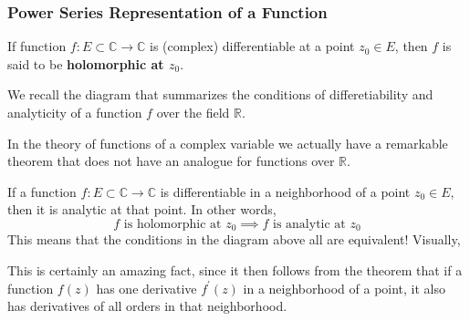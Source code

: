     \subsubsection{Power Series Representation of a Function}
    \begin{definition}
      \label{def:holomorphic-function}
      If function $f: E \subset \mathbb{C} \to \mathbb{C}$ is (complex) differentiable at a point $z_0 \in E$, then $f$ is said to be \textbf{holomorphic at $z_0$}. 
    \end{definition}

    We recall the diagram that summarizes the conditions of differetiability and analyticity of a function $f$ over the field $\mathbb{R}$. 
    \begin{center}
    \end{center}
    In the theory of functions of a complex variable we actually have a remarkable theorem that does not have an analogue for functions over $\mathbb{R}$. 

    \begin{theorem}
      \label{thm:analyticity-of-differentiable-functions-over-c}
    If a function $f: E \subset \mathbb{C} \to \mathbb{C}$ is differentiable in a neighborhood of a point $z_0 \in E$, then it is analytic at that point. In other words, 
    \begin{equation}
      f \text{ is holomorphic at } z_0 \implies f \text{ is analytic at } z_0
    \end{equation}
    This means that the conditions in the diagram above all are equivalent! Visually, 
    \begin{center}
    \end{center}
    This is certainly an amazing fact, since it then follows from the theorem that if a function $f(z)$ has one derivative $f^\prime (z)$ in a neighborhood of a point, it also has derivatives of all orders in that neighborhood. 
    \end{theorem}

